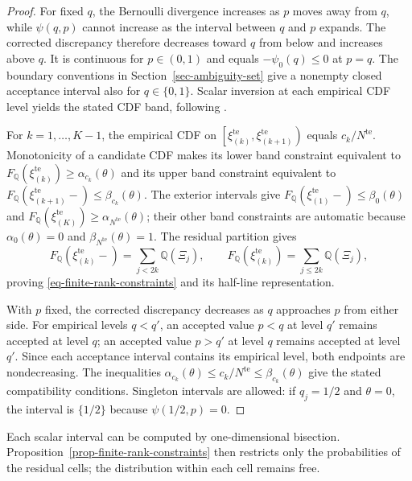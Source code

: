 \documentclass[review,11pt,3p,authoryear,nopreprintline]{elsarticle}
\begin{document}
\begin{proof}
  For fixed $q$, the Bernoulli divergence increases as $p$ moves away from $q$, while $\psi(q,p)$ cannot increase as the interval between $q$ and $p$ expands. The corrected discrepancy therefore decreases toward $q$ from below and increases above $q$. It is continuous for $p\in(0,1)$ and equals $-\psi_0(q)\le0$ at $p=q$. The boundary conventions in Section~\ref{sec-ambiguity-set} give a nonempty closed acceptance interval also for $q\in\{0,1\}$. Scalar inversion at each empirical CDF level yields the stated CDF band, following \citet[Supplement, Section~S.6]{L.J23}.

  For $k=1,\ldots,K-1$, the empirical CDF on $\left[\xi_{(k)}^{\mathrm{te}},\xi_{(k+1)}^{\mathrm{te}}\right)$ equals $c_k/N^{\mathrm{te}}$. Monotonicity of a candidate CDF makes its lower band constraint equivalent to $F_{\mathbb Q}\left(\xi_{(k)}^{\mathrm{te}}\right)\ge\alpha_{c_k}(\theta)$ and its upper band constraint equivalent to $F_{\mathbb Q}\left(\xi_{(k+1)}^{\mathrm{te}}-\right)\le\beta_{c_k}(\theta)$. The exterior intervals give $F_{\mathbb Q}\left(\xi_{(1)}^{\mathrm{te}}-\right)\le\beta_0(\theta)$ and $F_{\mathbb Q}\left(\xi_{(K)}^{\mathrm{te}}\right)\ge\alpha_{N^{\mathrm{te}}}(\theta)$; their other band constraints are automatic because $\alpha_0(\theta)=0$ and $\beta_{N^{\mathrm{te}}}(\theta)=1$. The residual partition gives
  \[
    F_{\mathbb Q}\left(\xi_{(k)}^{\mathrm{te}}-\right)=\sum_{j<2k}\mathbb Q(\Xi_j),
    \qquad
    F_{\mathbb Q}\left(\xi_{(k)}^{\mathrm{te}}\right)=\sum_{j\le2k}\mathbb Q(\Xi_j),
  \]
  proving \eqref{eq-finite-rank-constraints} and its half-line representation.

  With $p$ fixed, the corrected discrepancy decreases as $q$ approaches $p$ from either side. For empirical levels $q<q'$, an accepted value $p<q$ at level $q'$ remains accepted at level $q$; an accepted value $p>q'$ at level $q$ remains accepted at level $q'$. Since each acceptance interval contains its empirical level, both endpoints are nondecreasing. The inequalities $\alpha_{c_k}(\theta)\le c_k/N^{\mathrm{te}}\le\beta_{c_k}(\theta)$ give the stated compatibility conditions. Singleton intervals are allowed: if $q_j=1/2$ and $\theta=0$, the interval is $\{1/2\}$ because $\psi(1/2,p)=0$.
\end{proof}

Each scalar interval can be computed by one-dimensional bisection. Proposition~\ref{prop-finite-rank-constraints} then restricts only the probabilities of the residual cells; the distribution within each cell remains free.
\end{document}
